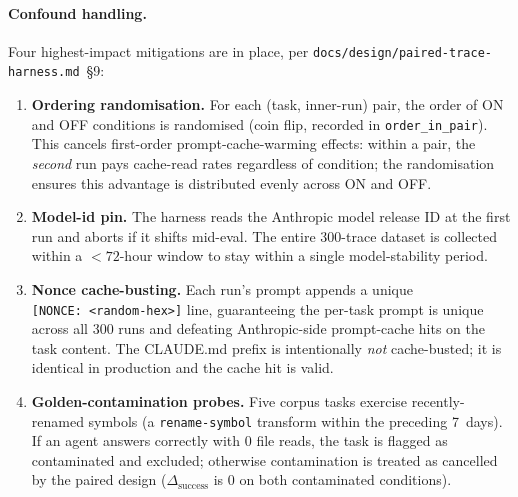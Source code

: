 \paragraph{Confound handling.}
Four highest-impact mitigations are in place, per
\texttt{docs/design/paired-trace-harness.md}~\S9:
\begin{enumerate}[leftmargin=*,nosep]
  \item \textbf{Ordering randomisation.}  For each (task, inner-run)
        pair, the order of ON and OFF conditions is randomised (coin
        flip, recorded in \texttt{order\_in\_pair}).  This cancels
        first-order prompt-cache-warming effects: within a pair, the
        \emph{second} run pays cache-read rates regardless of condition;
        the randomisation ensures this advantage is distributed evenly
        across ON and OFF.

  \item \textbf{Model-id pin.}  The harness reads the Anthropic model
        release ID at the first run and aborts if it shifts mid-eval.
        The entire 300-trace dataset is collected within a $<72$-hour
        window to stay within a single model-stability period.

  \item \textbf{Nonce cache-busting.}  Each run's prompt appends a
        unique \texttt{[NONCE:~<random-hex>]} line, guaranteeing the
        per-task prompt is unique across all 300 runs and defeating
        Anthropic-side prompt-cache hits on the task content.  The
        CLAUDE.md prefix is intentionally \emph{not} cache-busted; it
        is identical in production and the cache hit is valid.

  \item \textbf{Golden-contamination probes.}  Five corpus tasks
        exercise recently-renamed symbols (a \texttt{rename-symbol}
        transform within the preceding 7~days).  If an agent answers
        correctly with 0 file reads, the task is flagged as contaminated
        and excluded; otherwise contamination is treated as cancelled by
        the paired design ($\Delta_\text{success}$ is 0 on both
        contaminated conditions).
\end{enumerate}

